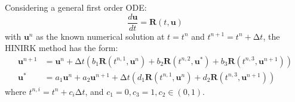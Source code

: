 \documentclass[preprint,12pt]{elsarticle}
\begin{document}
\newcommand{\uu}{\mathbf{u}}
\newcommand{\R}{\mathbf{R}}
\newcommand{\inc}{\mathrm\Delta}

Considering a general first order ODE:
\begin{equation}
    \frac{d\uu}{dt} = \R(t, \uu)
\end{equation}
with $\uu^n$ as the known numerical solution at $t=t^n$ and
$t^{n+1} = t^{n} + \inc t$,
the HINIRK method has the form:
\begin{subequations}
    \label{eq:HM3}
    \begin{align}
        \uu^{n+1} & = \uu^{n} +
        \inc t
        \left(
        b_1\R(t^{n,1}, \uu^n) +
        b_2\R(t^{n,2}, \uu^*) +
        b_3\R(t^{n,3}, \uu^{n+1})
        \right)   \label{eq:HM3-1} \\
        \uu^{*}   & =
        a_1\uu^{n} +
        a_2\uu^{n+1} +
        \inc t
        \left(
        d_1\R(t^{n,1}, \uu^n) +
        d_2\R(t^{n,3}, \uu^{n+1})
        \right) \label{eq:HM3-2}
    \end{align}
\end{subequations}
where $t^{n,i}=t^n+c_i\inc t$, and $c_1 = 0, c_3 = 1, c_2\in(0,1)$.
\end{document}

